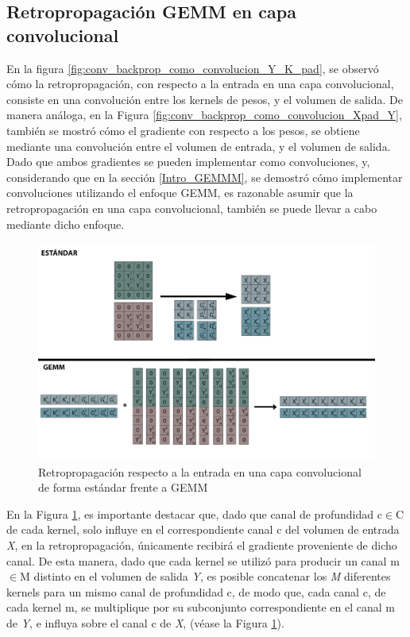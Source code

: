 \subsection{Retropropagación GEMM en capa convolucional}

En la figura \ref{fig:conv_backprop_como_convolucion_Y_K_pad}, se observó cómo la retropropagación, con respecto a la entrada en una capa convolucional, consiste en una convolución entre los kernels de pesos, y el volumen de salida. De manera análoga, en la Figura \ref{fig:conv_backprop_como_convolucion_Xpad_Y}, también se mostró cómo el gradiente con respecto a los pesos, se obtiene mediante una convolución entre el volumen de entrada, y el volumen de salida. \\
Dado que ambos gradientes se pueden implementar como convoluciones, y, considerando que en la sección \ref{Intro_GEMMM}, se demostró cómo implementar convoluciones utilizando el enfoque GEMM, es razonable asumir que la retropropagación en una capa convolucional, también se puede llevar a cabo mediante dicho enfoque.

\begin{figure}[H]
	\hspace{-20mm}
	\includegraphics[scale=0.3]{imagenes/conv_std_vs_gemm_backprop.jpg}  
	\caption{Retropropagación respecto a la entrada en una capa convolucional de forma estándar frente a GEMM}
	\label{fig:conv_std_vs_gemm_backprop}
\end{figure}

En la Figura \ref{fig:conv_std_vs_gemm_backprop}, es importante destacar que, dado que canal de profundidad c$\in$C de cada kernel, solo influye en el correspondiente canal c del volumen de entrada \textit{X}, en la retropropagación, únicamente recibirá el gradiente proveniente de dicho canal. De esta manera, dado que cada kernel se utilizó para producir un canal m$\in$M distinto en el volumen de salida \textit{Y}, es posible concatenar los \textit{M} diferentes kernels para un mismo canal de profundidad c, de modo que, cada canal c, de cada kernel m, se multiplique por su subconjunto correspondiente en el canal m de \textit{Y}, e influya sobre el canal c de \textit{X}, (véase la Figura \ref{fig:conv_std_vs_gemm_backprop}). 

